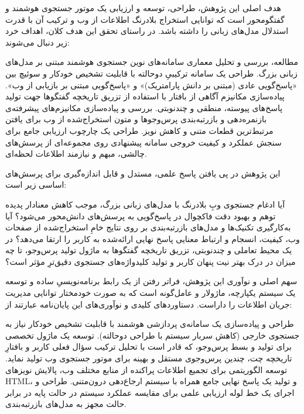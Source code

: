 
هدف اصلی این پژوهش، طراحی، توسعه و ارزیابی یک موتور جستجوی هوشمند و گفتگومحور است که توانایی استخراج بلادرنگ اطلاعات از وب و ترکیب آن با قدرت استدلال مدل‌های زبانی را داشته باشد. در راستای تحقق این هدف کلان، اهداف خرد زیر دنبال می‌شوند:

مطالعه، بررسی و تحلیل معماری سامانه‌های نوین جستجوی هوشمند مبتنی بر مدل‌های زبانی بزرگ.
طراحی یک سامانه ترکیبیِ دوحالته با قابلیت تشخیص خودکار و سوئیچ بین «پاسخ‌گویی عادی (مبتنی بر دانش پارامتریک)» و «پاسخ‌گویی مبتنی بر بازیابی از وب».
پیاده‌سازی مکانیزم آگاهی از بافتار با استفاده از تزریق تاریخچه گفتگوها جهت تولید پاسخ‌های پیوسته، منطقی و چندنوبتی.
بررسی و پیاده‌سازی مکانیزم‌های پیشرفته‌ی بازنمره‌دهی و بازرتبه‌بندی پرس‌وجوها و متون استخراج‌شده از وب برای یافتن مرتبط‌ترین قطعات متنی و کاهش نویز.
طراحی یک چارچوب ارزیابی جامع برای سنجش عملکرد و کیفیت خروجی سامانه پیشنهادی روی مجموعه‌ای از پرسش‌های چالشی، مبهم و نیازمند اطلاعات لحظه‌ای.


این پژوهش در پی یافتن پاسخ علمی، مستدل و قابل اندازه‌گیری برای پرسش‌های اساسی زیر است:

آیا ادغام جستجوی وبِ بلادرنگ با مدل‌های زبانی بزرگ، موجب کاهش معنادار پدیده توهم و بهبود دقت فاکچوال در پاسخ‌گویی به پرسش‌های دانش‌محور می‌شود؟
آیا به‌کارگیری تکنیک‌ها و مدل‌های بازرتبه‌بندی بر روی نتایج خامِ استخراج‌شده از صفحات وب، کیفیت، انسجام و ارتباط معنایی پاسخ نهایی ارائه‌شده به کاربر را ارتقا می‌دهد؟
در یک محیط تعاملی و چندنوبتی، تزریق تاریخچه گفتگوها به ماژول تولید پرس‌وجو، تا چه میزان در درک بهتر نیت پنهان کاربر و تولید کلیدواژه‌های جستجوی دقیق‌ترِ مؤثر است؟


سهم اصلی و نوآوری این پژوهش، فراتر رفتن از یک رابط برنامه‌نویسیِ ساده و توسعه یک سیستم یکپارچه، ماژولار و عامل‌گونه است که به صورت خودمختار توانایی مدیریت جریان اطلاعات را داراست. دستاوردهای کلیدی و نوآوری‌های این پایان‌نامه عبارتند از:

طراحی و پیاده‌سازی یک سامانه‌ی پردازشی هوشمند با قابلیت تشخیص خودکار نیاز به جستجوی خارجی (کاهش سربار سیستم با طراحی دوحالته).
توسعه یک ماژول تخصصی برای تولید و بسط پرس‌وجو، که قادر است با تحلیل ترکیب سؤال فعلی کاربر و بافتارِ تاریخچه چت، چندین پرس‌وجوی مستقل و بهینه برای موتور جستجوی وب تولید نماید.
توسعه الگوریتمی برای تجمیع اطلاعات پراکنده از منابع مختلف وب، پالایش نویزهای HTML، و تولید یک پاسخ نهایی جامع همراه با سیستم ارجاع‌دهی درون‌متنی.
طراحی و اجرای یک خط لوله ارزیابی علمی برای مقایسه عملکرد سیستم در حالت پایه در برابر حالت مجهز به مدل‌های بازرتبه‌بندی.

